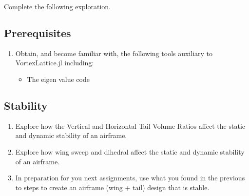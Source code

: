 \documentclass[11pt,twocolumn]{article}
\begin{document}
Complete the following exploration.

\subsection{Prerequisites}
\label{ssec:prereqs}

\begin{enumerate}[label=\roman*.]
	\item Obtain, and become familiar with, the following tools auxiliary to VortexLattice.jl including:
	\begin{itemize}
		\item The eigen value code
	\end{itemize}
\end{enumerate}



\subsection{Stability}

\begin{enumerate}[label=\roman*.]
	\item Explore how the Vertical and Horizontal Tail Volume Ratios affect the static and dynamic stability of an airframe.
	\item Explore how wing sweep and dihedral affect the static and dynamic stability of an airframe.
	\item In preparation for you next assignments, use what you found in the previous to steps to create an airframe (wing + tail) design that is stable.
\end{enumerate}
\end{document}
